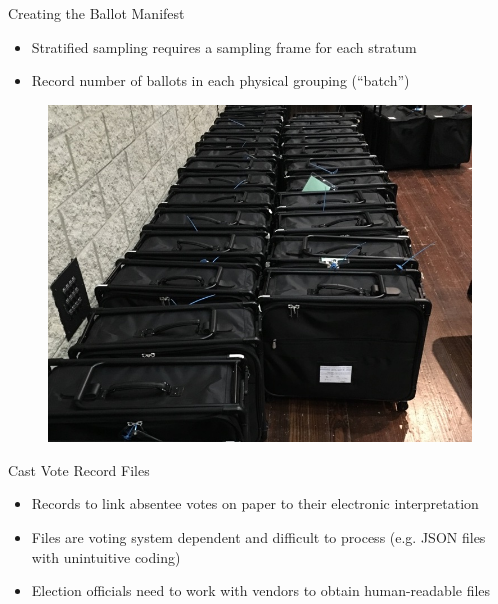 \documentclass[final]{beamer}
\newlength{\onecolwid}
\newlength{\twocolwid}
\begin{document}
\begin{frame}[t]
\begin{columns}[t]
\begin{column}{\twocolwid}

\begin{columns}[t,totalwidth=\twocolwid] %

\begin{column}{\onecolwid} %


\begin{block}{Creating the Ballot Manifest}

\begin{itemize}
\item Stratified sampling requires a sampling frame for each stratum
\item Record number of ballots in each physical grouping (``batch'')
\end{itemize}
\begin{figure}
\includegraphics[width=0.7\linewidth]{../photo/ballotbags}
\end{figure}
\end{block}

\begin{block}{Cast Vote Record Files}
\begin{itemize}
\item Records to link absentee votes on paper to their electronic interpretation
\item Files are voting system dependent and difficult to process (e.g. JSON files with unintuitive coding)
\item Election officials need to work with vendors to obtain human-readable files
\end{itemize}
\end{block}


\end{column}
\end{columns}
\end{column}
\end{columns}
\end{frame}
\end{document}

